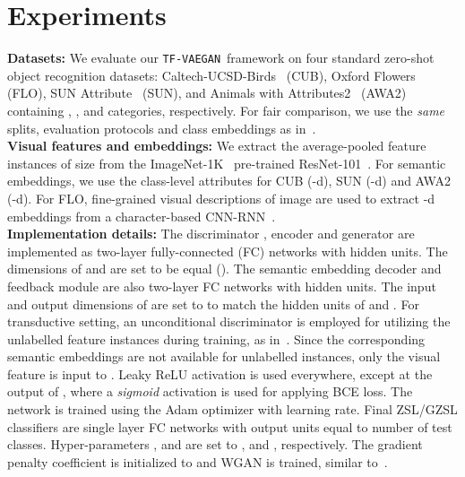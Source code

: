 \documentclass[runningheads]{llncs}
\newcommand{\proposed}{\texttt{TF-VAEGAN}}
\begin{document}
\section{Experiments}
\noindent\textbf{Datasets:} We evaluate our \proposed~framework on four standard zero-shot object recognition datasets: Caltech-UCSD-Birds~\cite{cub} (CUB), Oxford Flowers~\cite{flo} (FLO), SUN Attribute~\cite{sun} (SUN), and Animals with Attributes2~\cite{zsl-good-bad-ugly} (AWA2) containing , ,  and  categories, respectively. For fair comparison, we use the \emph{same} splits, evaluation protocols and class embeddings as in~\cite{zsl-good-bad-ugly}.\\
\noindent\textbf{Visual features and embeddings:} We extract the average-pooled feature instances of size  from the ImageNet-1K~\cite{imagenet} pre-trained ResNet-101~\cite{resnet}. For semantic
 embeddings, we use the class-level attributes for CUB (-d), SUN (-d) and AWA2 (-d). For FLO, fine-grained visual descriptions of image are used to extract -d embeddings from a character-based CNN-RNN~\cite{reed16cvpr}. \\
\noindent\textbf{Implementation details:} The discriminator , encoder  and generator  are implemented as two-layer fully-connected (FC) networks with  hidden units. 
The dimensions of  and  are set to be equal (). The semantic embedding decoder  and feedback module  are also two-layer FC networks with  hidden units. The input and output dimensions of  are set to  to match the hidden units of  and . For transductive setting, an unconditional discriminator  is employed for utilizing the unlabelled feature instances during training, as in~\cite{Xian19cvpr}. Since the corresponding semantic embeddings are not available for unlabelled instances, only the visual feature is input to . Leaky ReLU activation is used everywhere, except at the output of , where a \textit{sigmoid} activation is used for applying BCE loss. The network is trained using the Adam optimizer with  learning rate. Final ZSL/GZSL classifiers are single layer FC networks with output units equal to number of test classes. Hyper-parameters ,  and  are set to ,  and , respectively. The gradient penalty coefficient  is initialized to  and WGAN is trained, similar to~\cite{wgan}.
\end{document}
